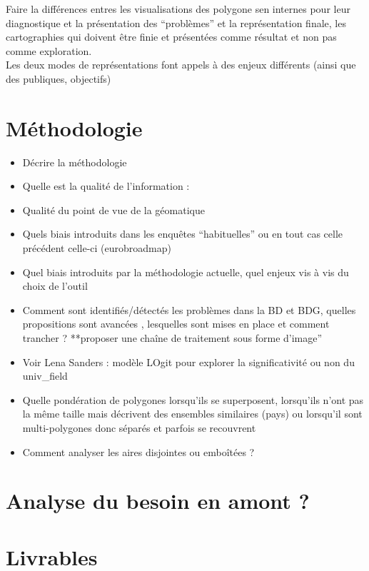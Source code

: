 \documentclass[
  a4paper,
]{scrbook}
\providecommand{\tightlist}{%
  \setlength{\itemsep}{0pt}\setlength{\parskip}{0pt}}\usepackage{longtable,booktabs,array}
\begin{document}
Faire la différences entres les visualisations des polygone sen internes
pour leur diagnostique et la présentation des ``problèmes'' et la
représentation finale, les cartographies qui doivent être finie et
présentées comme résultat et non pas comme exploration.\\
Les deux modes de représentations font appels à des enjeux différents
(ainsi que des publiques, objectifs)

\hypertarget{muxe9thodologie}{%
\section{Méthodologie}\label{muxe9thodologie}}

\begin{itemize}
\tightlist
\item
  Décrire la méthodologie
\item
  Quelle est la qualité de l'information :
\item
  Qualité du point de vue de la géomatique
\item
  Quels biais introduits dans les enquêtes ``habituelles'' ou en tout
  cas celle précédent celle-ci (eurobroadmap)
\item
  Quel biais introduits par la méthodologie actuelle, quel enjeux vis à
  vis du choix de l'outil
\item
  Comment sont identifiés/détectés les problèmes dans la BD et BDG,
  quelles propositions sont avancées , lesquelles sont mises en place et
  comment trancher ? **proposer une chaîne de traitement sous forme
  d'image''
\item
  Voir Lena Sanders : modèle LOgit pour explorer la significativité ou
  non du univ\_field
\item
  Quelle pondération de polygones lorsqu'ils se superposent, lorsqu'ils
  n'ont pas la même taille mais décrivent des ensembles similaires
  (pays) ou lorsqu'il sont multi-polygones donc séparés et parfois se
  recouvrent
\item
  Comment analyser les aires disjointes ou emboîtées ?
\end{itemize}

\hypertarget{analyse-du-besoin-en-amont}{%
\section{Analyse du besoin en amont
?}\label{analyse-du-besoin-en-amont}}

\hypertarget{livrables}{%
\section{Livrables}\label{livrables}}
\end{document}
